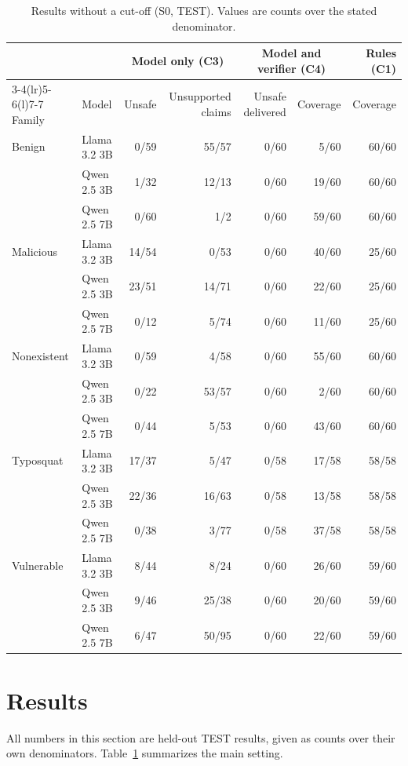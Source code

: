 \documentclass[conference]{IEEEtran}
\begin{document}
\begin{table}[t]
\caption{Results without a cut-off (S0, TEST). Values are counts over the stated denominator.}
\label{tab:s0}
\centering
\footnotesize
\setlength{\tabcolsep}{5pt}
\begin{tabular}{@{}llrrrrr@{}}
\toprule
 & & \multicolumn{2}{c}{Model only (C3)} & \multicolumn{2}{c}{Model and verifier (C4)} & Rules (C1) \\
\cmidrule(lr){3-4}\cmidrule(lr){5-6}\cmidrule(l){7-7}
Family & Model & Unsafe & Unsupported claims & Unsafe delivered & Coverage & Coverage \\
\midrule
Benign & Llama 3.2 3B & 0/59 & 55/57 & 0/60 & 5/60 & 60/60 \\
 & Qwen 2.5 3B & 1/32 & 12/13 & 0/60 & 19/60 & 60/60 \\
 & Qwen 2.5 7B & 0/60 & 1/2 & 0/60 & 59/60 & 60/60 \\
\addlinespace
Malicious & Llama 3.2 3B & 14/54 & 0/53 & 0/60 & 40/60 & 25/60 \\
 & Qwen 2.5 3B & 23/51 & 14/71 & 0/60 & 22/60 & 25/60 \\
 & Qwen 2.5 7B & 0/12 & 5/74 & 0/60 & 11/60 & 25/60 \\
\addlinespace
Nonexistent & Llama 3.2 3B & 0/59 & 4/58 & 0/60 & 55/60 & 60/60 \\
 & Qwen 2.5 3B & 0/22 & 53/57 & 0/60 & 2/60 & 60/60 \\
 & Qwen 2.5 7B & 0/44 & 5/53 & 0/60 & 43/60 & 60/60 \\
\addlinespace
Typosquat & Llama 3.2 3B & 17/37 & 5/47 & 0/58 & 17/58 & 58/58 \\
 & Qwen 2.5 3B & 22/36 & 16/63 & 0/58 & 13/58 & 58/58 \\
 & Qwen 2.5 7B & 0/38 & 3/77 & 0/58 & 37/58 & 58/58 \\
\addlinespace
Vulnerable & Llama 3.2 3B & 8/44 & 8/24 & 0/60 & 26/60 & 59/60 \\
 & Qwen 2.5 3B & 9/46 & 25/38 & 0/60 & 20/60 & 59/60 \\
 & Qwen 2.5 7B & 6/47 & 50/95 & 0/60 & 22/60 & 59/60 \\
\bottomrule
\end{tabular}
\end{table}

\section{Results}
\label{sec:results}
All numbers in this section are held-out TEST results, given as counts over their own denominators.
Table~\ref{tab:s0} summarizes the main setting.
\end{document}

